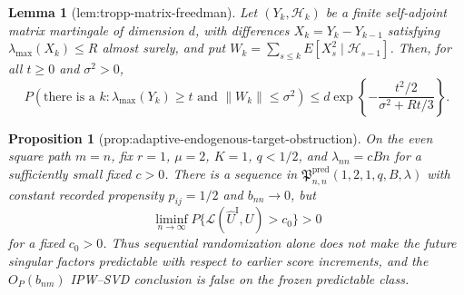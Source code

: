 \documentclass{article}
\newtheorem{lemma}{Lemma}
\newtheorem{proposition}{Proposition}
\begin{document}
\begin{lemma}[lem:tropp-matrix-freedman]\label{lem:tropp-matrix-freedman}
Let \((Y_k,\mathcal H_k)\) be a finite self-adjoint matrix martingale of dimension \(d\), with differences \(X_k=Y_k-Y_{k-1}\) satisfying \(\lambda_{\max}(X_k)\le R\) almost surely, and put \(W_k=\sum_{s\le k}E[X_s^2\mid\mathcal H_{s-1}]\).  Then, for all \(t\ge0\) and \(\sigma^2>0\),
\[
 P\!\left(\text{there is a }k:\lambda_{\max}(Y_k)\ge t
 \text{ and }\lVert W_k\rVert\le\sigma^2\right)
 \le d\exp\!\left\{-\frac{t^2/2}{\sigma^2+Rt/3}\right\}.
\]
\end{lemma}

\begin{proposition}[prop:adaptive-endogenous-target-obstruction]\label{prop:adaptive-endogenous-target-obstruction}
On the even square path \(m=n\), fix \(r=1\), \(\mu=2\), \(K=1\), \(q<1/2\), and \(\lambda_{nn}=cBn\) for a sufficiently small fixed \(c>0\).  There is a sequence in \(\mathfrak P^{\mathrm{pred}}_{n,n}(1,2,1,q,B,\lambda)\) with constant recorded propensity \(p_{ij}=1/2\) and \(b_{nn}\to0\), but
\[
 \liminf_{n\to\infty}P\{\mathcal L(\widehat U^{\mathrm I},U)>c_0\}>0
\]
for a fixed \(c_0>0\).  Thus sequential randomization alone does not make the future singular factors predictable with respect to earlier score increments, and the \(O_P(b_{nm})\) IPW--SVD conclusion is false on the frozen predictable class.
\end{proposition}
\end{document}
